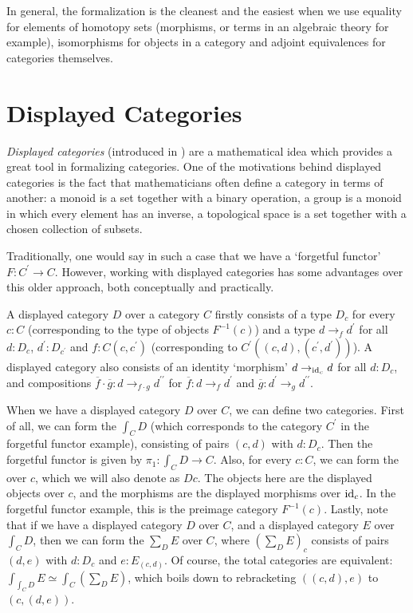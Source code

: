 In general, the formalization is the cleanest and the easiest when we use equality for elements of homotopy sets (morphisms, or terms in an algebraic theory for example), isomorphisms for objects in a category and adjoint equivalences for categories themselves.

\section{Displayed Categories}\label{sec:displayed-categories}

\textit{Displayed categories} (introduced in \autocite{displayed-categories}) are a mathematical idea which provides a great tool in formalizing categories. One of the motivations behind displayed categories is the fact that mathematicians often define a category in terms of another: a monoid is a set together with a binary operation, a group is a monoid in which every element has an inverse, a topological space is a set together with a chosen collection of subsets.

Traditionally, one would say in such a case that we have a `forgetful functor' $ F : C^\prime \to C $. However, working with displayed categories has some advantages over this older approach, both conceptually and practically.

A displayed category $ D $ over a category $ C $ firstly consists of a type $ D_c $ for every $ c : C $ (corresponding to the type of objects $ F^{-1}(c) $) and a type $ d \to_f d^\prime $ for all $ d: D_c $, $ d^\prime : D_{c^\prime} $ and $ f : C(c, c^\prime) $ (corresponding to $ C^\prime((c, d), (c^\prime, d^\prime)) $). A displayed category also consists of an identity `morphism' $ d \to_{\text{id}_{c}} d $ for all $ d : D_c $, and compositions $ \overline f \cdot \overline g : d \to_{f \cdot g} d^{\prime \prime} $ for $ \overline f : d \to_f d^\prime $ and $ \overline g : d^\prime \to_g d^{\prime \prime} $.

When we have a displayed category $ D $ over $ C $, we can define two categories. First of all, we can form the  $ \int_C D $ (which corresponds to the category $ C^\prime $ in the forgetful functor example), consisting of pairs $ (c, d) $ with $ d : D_c $. Then the forgetful functor is given by $ \pi_1 : \int_C D \to C $. Also, for every $ c : C $, we can form the  over $ c $, which we will also denote as $ D c $. The objects here are the displayed objects over $ c $, and the morphisms are the displayed morphisms over $ \text{id}_{c} $. In the forgetful functor example, this is the preimage category $ F^{-1}(c) $. Lastly, note that if we have a displayed category $ D $ over $ C $, and a displayed category $ E $ over $ \int_C D $, then we can form the  $ \sum_D E $ over $ C $, where $ (\sum_D E)_c $ consists of pairs $ (d, e) $ with $ d : D_c $ and $ e : E_{(c, d)} $. Of course, the total categories are equivalent: $ \int_{\int_C D} E \simeq \int_C (\sum_D E) $, which boils down to rebracketing $ ((c, d), e) $ to $ (c, (d, e)) $.

